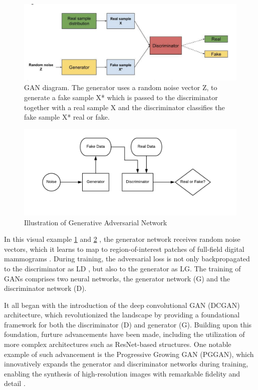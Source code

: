 \documentclass[UKenglish,12pt]{master-style}
\begin{document}
\begin{figure}[ht]
    \centering
    \includegraphics[width=1\textwidth]{Images/GAN_architecture}
    \caption{GAN diagram. The generator uses a random noise vector Z, to generate a fake sample X* which is passed to the discriminator together with a real sample X and the discriminator classifies the fake sample X* real or fake.}
    \label{fig:gan_framework}
\end{figure}

\begin{figure}[ht]
    \centering
    \includegraphics[width=1\textwidth]{Images/GAN.png}
    \caption{Illustration of Generative Adversarial Network}
    \label{fig:GAN}
\end{figure}

In this visual example \ref{fig:gan_framework} and \ref{fig:GAN} \cite{medigan}, the generator network receives random noise vectors, which it learns to map to region-of-interest patches of full-field digital mammograms \cite{GAN} . During training, the adversarial loss is not only backpropagated to the discriminator as LD , but also to the generator as LG. The training of GANs comprises two neural networks, the generator network (G) and the discriminator network (D).

It all began with the introduction of the deep convolutional GAN (DCGAN) architecture, which revolutionized the landscape by providing a foundational framework for both the discriminator (D) and generator (G). Building upon this foundation, furture advancements have been made, including the utilization of more complex architectures such as ResNet-based structures. One notable example of such advancement is the Progressive Growing GAN (PGGAN), which innovatively expands the generator and discriminator networks during training, enabling the synthesis of high-resolution images with remarkable fidelity and detail \cite{medigan}.
\end{document}
